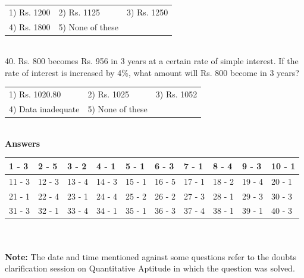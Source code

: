 \documentclass{article}
\begin{document}
	\noindent \begin{tabular}{p{1.7in} p{1.6in} p{1.6in}} \\ 
 1) Rs. 1200                 &  2) Rs. 1125          &  3) Rs. 1250          \\
4) Rs. 1800          & 5) None of these  \\
\end{tabular}
	
	\noindent 
	
	\noindent 
	
	\noindent  \\ 40.  Rs. 800 becomes Rs. 956 in 3 years at a certain rate of simple interest. If the rate of interest is increased by 4\%, what amount will Rs. 800 become in 3 years?
	
	\noindent 
	

		\begin{tabular}{p{1.7in} p{1.6in} p{1.6in}} \\ 
 1) Rs. 1020.80  &  2) Rs. 1025 &  3) Rs. 1052
		\\
4) Data inadequate  & 5) None of these  \\
\end{tabular}

	
	
	
	\noindent 
	
	\noindent 
	
	\noindent 
	
	\noindent 
	
	\noindent 
	
	\noindent 
	
	\noindent 
	
	\noindent 
	
	\noindent 
	
	\noindent 
	
	\noindent \\  \textbf{Answers}
	
	\noindent 
	
	\noindent 
	
	\begin{tabular}{|p{0.7in}|p{0.5in}|p{0.5in}|p{0.5in}|p{0.5in}|p{0.5in}|p{0.5in}|p{0.5in}|p{0.5in}|p{0.5in}|} \hline 
		1 - 3 & 2 - 5 & 3 - 2 & 4 - 1 & 5 - 1 & 6 - 3 & 7 - 1 & 8 - 4 & 9 - 3 & 10 - 1 \\ \hline 
		11 - 3 & 12 - 3 & 13 - 4 & 14 - 3 & 15 - 1 & 16 - 5 & 17 - 1 & 18 - 2 & 19 - 4 & 20 - 1 \\ \hline 
		21 - 1 & 22 - 4 & 23 - 1 & 24 - 4 & 25 - 2 & 26 - 2 & 27 - 3 & 28 - 1 & 29 - 3 & 30 - 3 \\ \hline 
		31 - 3 & 32 - 1 & 33 - 4 & 34 - 1 & 35 - 1 & 36 - 3 & 37 - 4 & 38 - 1 & 39 - 1 & 40 - 3 \\ \hline 
	\end{tabular}
	
	
	
	\noindent 
	
	\noindent  \\ 
	
	\noindent \\  \textbf{Note: }The date and time mentioned against some questions refer to the doubts clarification session on Quantitative Aptitude in which the question was solved.
	
\end{document}

